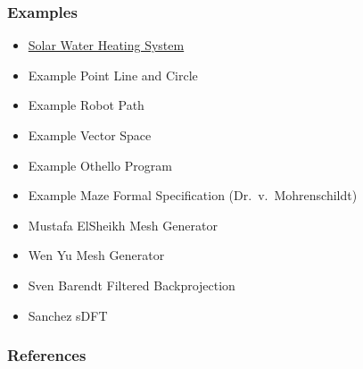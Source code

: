 \documentclass[t,12pt,numbers,fleqn,handout]{beamer}
\begin{document}
\begin{frame}
\frametitle{Examples}

\begin{itemize}
\item
  \href{https://github.com/smiths/swhs/blob/master/docs/Design/MIS/PCM_MIS.pdf} {Solar Water Heating System}
\item Example Point Line and Circle
\item Example Robot Path
\item Example Vector Space
\item Example Othello Program
\item Example Maze Formal Specification (Dr.\ v.\ Mohrenschildt)
\item Mustafa ElSheikh Mesh Generator \cite{CaretteEtAl2011}
\item Wen Yu Mesh Generator \cite{SmithAndYu2009}
\item Sven Barendt Filtered Backprojection
\item Sanchez sDFT
\end{itemize}

\end{frame}


\begin{frame}[allowframebreaks]
\frametitle{References}



\end{frame}

\end{document}
